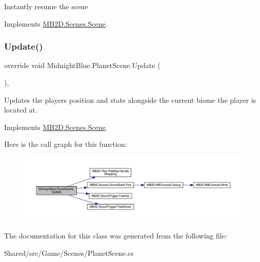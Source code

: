 Instantly resume the scene 



Implements \hyperlink{class_m_b2_d_1_1_scenes_1_1_scene_ad13639db22b059a1b714eefd9d927735}{M\+B2\+D.\+Scenes.\+Scene}.

\hypertarget{class_midnight_blue_1_1_planet_scene_add0a85b4f754f026231aa7269259c65c}{}\label{class_midnight_blue_1_1_planet_scene_add0a85b4f754f026231aa7269259c65c} 
\subsubsection{\texorpdfstring{Update()}{Update()}}
{\footnotesize\ttfamily override void Midnight\+Blue.\+Planet\+Scene.\+Update (\begin{DoxyParamCaption}{ }\end{DoxyParamCaption})\hspace{0.3cm}{\ttfamily [inline]}, {\ttfamily [virtual]}}



Updates the players position and state alongside the current biome the player is located at. 



Implements \hyperlink{class_m_b2_d_1_1_scenes_1_1_scene_a779de7c1ab23b698dcde3a228324a991}{M\+B2\+D.\+Scenes.\+Scene}.

Here is the call graph for this function\+:\nopagebreak
\begin{figure}[H]
\begin{center}
\leavevmode
\includegraphics[width=350pt]{class_midnight_blue_1_1_planet_scene_add0a85b4f754f026231aa7269259c65c_cgraph}
\end{center}
\end{figure}


The documentation for this class was generated from the following file\+:\begin{DoxyCompactItemize}
\item 
Shared/src/\+Game/\+Scenes/Planet\+Scene.\+cs\end{DoxyCompactItemize}
